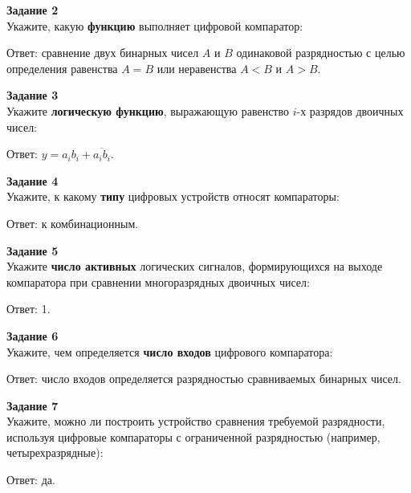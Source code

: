 \documentclass[spec, och, labwork]{shiza}
\begin{document}
\textbf{Задание 2}\\
    Укажите, какую \textbf{функцию} выполняет цифровой компаратор:
    
    Ответ: сравнение двух бинарных чисел $A$ и $B$ одинаковой разрядностью с целью определения равенства $A = B$ или
    неравенства $A < B$ и $A > B$.

\textbf{Задание 3}\\
    Укажите \textbf{логическую функцию}, выражающую равенство $i$-х разрядов двоичных чисел:

    Ответ: $y = a_i b_i + \overline{a_i b_i}$.
    
\textbf{Задание 4}\\
     Укажите, к какому \textbf{типу} цифровых устройств относят компараторы: 

     Ответ: к комбинационным.

\textbf{Задание 5}\\
    Укажите \textbf{число активных} логических сигналов, формирующихся на выходе компаратора при сравнении многоразрядных двоичных чисел:

    Ответ: 1.
    
\textbf{Задание 6}\\
    Укажите, чем определяется \textbf{число входов} цифрового компаратора:

    Ответ: число входов определяется разрядностью сравниваемых бинарных чисел.
    
\textbf{Задание 7}\\
    Укажите, можно ли построить устройство сравнения требуемой разрядности, используя цифровые компараторы с
    ограниченной разрядностью (например, четырехразрядные):

    Ответ: да.
\end{document}
